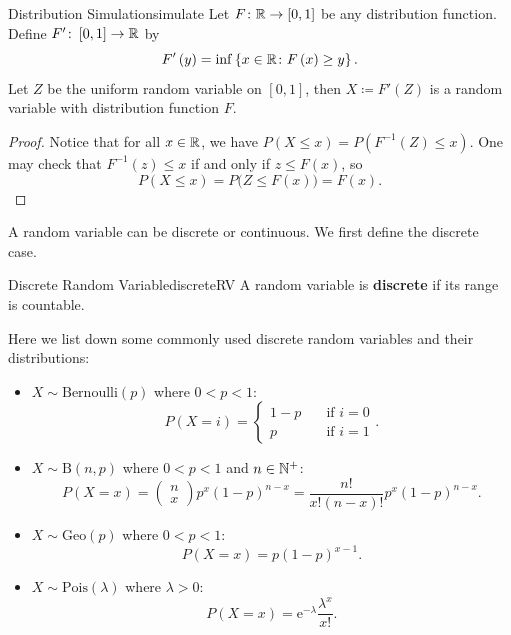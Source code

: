 \documentclass[math, code]{amznotes}
\theoremstyle{remark}
\newcommand{\e}{\mathrm{e}}
\begin{document}
\begin{thmbox}{Distribution Simulation}{simulate}
    Let $F \colon \mathbb{R} \to \left[0, 1\right]$ be any distribution function. Define $F' \colon \left[0, 1\right] \to \mathbb{R}$ by
    \begin{equation*}
        F'\left(y\right) = \inf \left\{x \in \mathbb{R} \colon F\left(x\right) \geq y\right\}.
    \end{equation*}
    Let $Z$ be the uniform random variable on $\left[0, 1\right]$, then $X \coloneqq F'\left(Z\right)$ is a random variable with distribution function $F$.
    \tcblower
    \begin{proof}
        Notice that for all $x \in \mathbb{R}$, we have $P\left(X \leq x\right) = P\left(F^{-1}\left(Z\right) \leq x\right)$. One may check that $F^{-1}\left(z\right) \leq x$ if and only if $z \leq F\left(x\right)$, so 
        \begin{equation*}
            P\left(X \leq x\right) = P\bigl(Z \leq F\left(x\right)\bigr) = F\left(x\right).
        \end{equation*}
    \end{proof}
\end{thmbox}
A random variable can be discrete or continuous. We first define the discrete case.
\begin{dfnbox}{Discrete Random Variable}{discreteRV}
    A random variable is {\color{red} \textbf{discrete}} if its range is countable.
\end{dfnbox}
Here we list down some commonly used discrete random variables and their distributions:
\begin{itemize}
    \item $X \sim \mathrm{Bernoulli}\left(p\right)$ where $0 < p < 1$:
    \begin{equation*}
        P\left(X = i\right) = \begin{cases}
            1 - p & \quad\textrm{if } i = 0 \\
            p & \quad\textrm{if } i = 1
        \end{cases}.
    \end{equation*}
    \item $X \sim \mathrm{B}\left(n, p\right)$ where $0 < p < 1$ and $n \in \mathbb{N}^+$:
    \begin{equation*}
        P\left(X = x\right) = \begin{pmatrix}
            n \\
            x
        \end{pmatrix}p^x\left(1 - p\right)^{n - x} = \frac{n!}{x!\left(n - x\right)!}p^x\left(1 - p\right)^{n - x}.
    \end{equation*}
    \item $X \sim \mathrm{Geo}\left(p\right)$ where $0 < p < 1$:
    \begin{equation*}
        P\left(X = x\right) = p\left(1 - p\right)^{x - 1}.
    \end{equation*}
    \item $X \sim \mathrm{Pois}\left(\lambda\right)$ where $\lambda > 0$:
    \begin{equation*}
        P\left(X = x\right) = \e^{-\lambda}\frac{\lambda^x}{x!}.
    \end{equation*}
\end{itemize}
\end{document}
